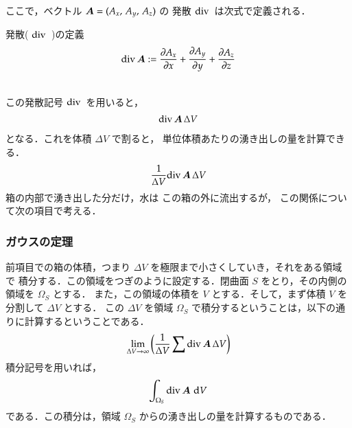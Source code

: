         ここで，ベクトル $\boldsymbol{A}=(A_{x},\, A_{y},\, A_{z})$ の
        発散 $\mathrm{div}\,$ は次式で定義される．\\
        \begin{itembox}[l]{発散( $\mathrm{div}\,$ )の定義}
            \begin{align}
                \mathrm{div\,}\boldsymbol{A}:=
                \frac{\partial A_{x}}{\partial x}+
                \frac{\partial A_{y}}{\partial y}+
                \frac{\partial A_{z}}{\partial z}
            \end{align}
        \end{itembox}\\

        この発散記号 $\mathrm{div}\,$ を用いると，
            \begin{align}
                \mathrm{div\,}\boldsymbol{A}\,\Delta V
            \end{align}
        となる．これを体積 $\Delta V$ で割ると，
        単位体積あたりの湧き出しの量を計算できる．
            \begin{align}
                \frac{1}{\Delta V}\mathrm{div\,}\boldsymbol{A}\,\Delta V
            \end{align}
        箱の内部で湧き出した分だけ，水は
        この箱の外に流出するが，
        この関係について次の項目で考える．




 \subsubsection{ガウスの定理}

        前項目での箱の体積，つまり $\Delta V$ を極限まで小さくしていき，それをある領域で
        積分する．この領域をつぎのように設定する．閉曲面 $S$ をとり，その内側の領域を $\Omega_{S}$  とする．
        また，この領域の体積を $V$ とする．そして，まず体積 $V$ を分割して $\Delta V$ とする．
        この $\Delta V$ を領域 $\Omega_{S}$ で積分するということは，以下の通りに計算するということである．
            \begin{equation*}
                \lim_{\Delta V \to \infty}\left(\frac{1}{\Delta V}\sum\mathrm{div\,}\boldsymbol{A}\,\Delta V\right)
            \end{equation*}
        積分記号を用いれば，
            \begin{align}\label{divA1}
                \int_{\Omega_{S}} \mathrm{div\,}\bA\,\df V
            \end{align}
        である．この積分は，領域 $\Omega_{S}$ からの湧き出しの量を計算するものである．

